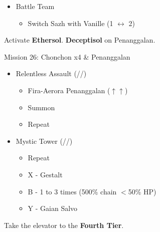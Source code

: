 \begin{multicols}{2}
\begin{menu}
\begin{itemize}
\begin{itemize}
{\paradigmline{(\rav)}{(\rav)}{(\sen)}}%
{\paradigmline{\com}{(\rav)}{\com}}%
{\paradigmline{\rav}{\sab}{(\sen)}}%
{\paradigmline{\com}{\rav}{\com}}
    \end{itemize}
    \item Battle Team
    \begin{itemize}
        \item Switch Sazh with Vanille (1 $\leftrightarrow$ 2)
    \end{itemize}
\end{itemize}
\end{menu}
 Activate \textbf{Ethersol}. \textbf{Deceptisol} on Penanggalan.
\renewcommand{\second}{[2] Relentless Assault (\rav/\rav/\com)}
\renewcommand{\third}{[3] Mystic Tower (\rav/\rav/\sen)}

\begin{battle}{Mission 26: Chonchon x4 \& Penanggalan}
\begin{itemize}
    \item \second
    \begin{itemize}
        \item Fira-Aerora Penanggalan ($\uparrow\uparrow$)
        \item Summon
        \item Repeat
    \end{itemize}
    \columnbreak
    \item \third
    \begin{itemize}
        \item Repeat
        \item X - Gestalt
        \item B - 1 to 3 times (500\% chain $<$50\% HP)
        \item Y - Gaian Salvo
    \end{itemize}
\end{itemize}
\end{battle}
Take the elevator to the \textbf{Fourth Tier}.
\end{multicols}
\newpage
